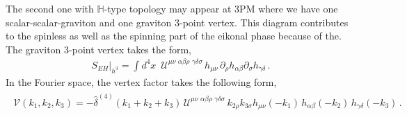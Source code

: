  The second one with $\mathbb{H}$-type topology may appear at 3PM where we have one scalar-scalar-graviton and one graviton 3-point vertex. This diagram contributes to the spinless as well as the spinning part of the eikonal phase because of the.
The graviton 3-point vertex takes the form,
\begin{align}
    S_{EH}\Big|_{h^3}=\int d^4x \,\,\,\mathcal{U}^{\mu\nu\,\,\alpha\beta\rho\,\,\gamma\delta\sigma}\,h_{\mu\nu}\,\partial_{\rho}h_{\alpha\beta}\partial_{\sigma}h_{\gamma\delta}\,.
\end{align}
In the Fourier space, the vertex factor takes the following form,
\begin{align}
    \begin{split}
        \mathcal{V}(k_1,k_2,k_3)=-\hat\delta^{(4)}(k_1+k_2+k_3)\,\mathcal{U}^{\mu\nu\,\,\alpha\beta\rho\,\,\gamma\delta\sigma}\,k_{2\rho}k_{3\sigma}h_{\mu\nu}(-k_1)\,h_{\alpha\beta}(-k_2)\,h_{\gamma\delta}(-k_3)\,.
    \end{split}
\end{align}
